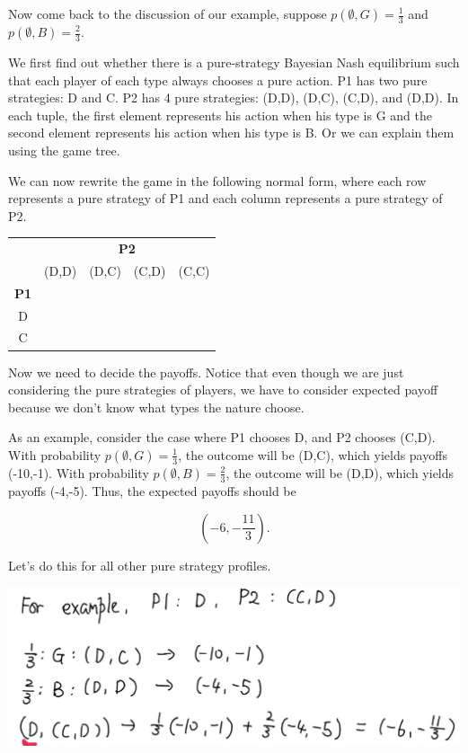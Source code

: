 \documentclass[12pt, oneside]{article}
\begin{document}
Now come back to the discussion of our example, suppose \( p(\emptyset, G) = \frac{1}{3} \) and \( p(\emptyset, B) = \frac{2}{3} \).

We first find out whether there is a pure-strategy Bayesian Nash equilibrium such that each player of each type always chooses a pure action. P1 has two pure strategies: D and C. P2 has 4 pure strategies: (D,D), (D,C), (C,D), and (D,D). In each tuple, the first element represents his action when his type is G and the second element represents his action when his type is B. Or we can explain them using the game tree.

We can now rewrite the game in the following normal form, where each row represents a pure strategy of P1 and each column represents a pure strategy of P2.

\begin{table}[h]
    \centering
    \renewcommand{\arraystretch}{1.5}
    \setlength{\tabcolsep}{12pt}
    \begin{tabular}{c|c c c c}
        \multicolumn{1}{c}{} & \multicolumn{4}{c}{\textbf{P2}} \\
        \multicolumn{1}{c}{} & (D,D) & (D,C) & (C,D) & (C,C) \\
        \hline
        \textbf{P1} & & & & \\
        D & & & & \\
        C & & & & \\
    \end{tabular}
\end{table}

Now we need to decide the payoffs. Notice that even though we are just considering the pure strategies of players, we have to consider expected payoff because we don’t know what types the nature choose.

As an example, consider the case where P1 chooses D, and P2 chooses (C,D). With probability \( p(\emptyset, G) = \frac{1}{3} \), the outcome will be (D,C), which yields payoffs (-10,-1). With probability \( p(\emptyset, B) = \frac{2}{3} \), the outcome will be (D,D), which yields payoffs (-4,-5). Thus, the expected payoffs should be 

\[
\left( -6, -\frac{11}{3} \right).
\]

Let's do this for all other pure strategy profiles.

\includegraphics{Figure/cpt_process1.png}
\end{document}
